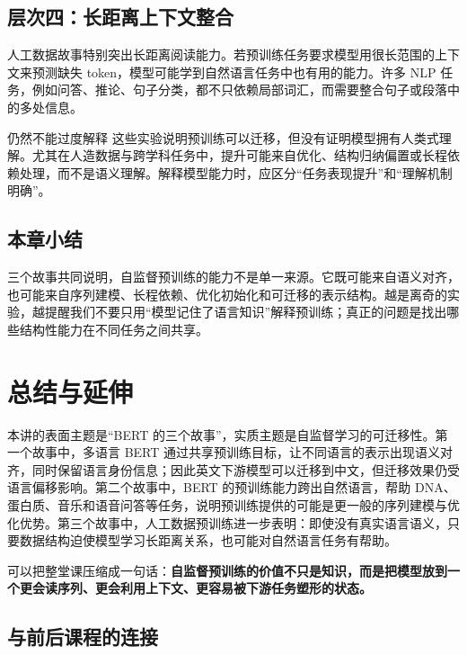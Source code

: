 \documentclass[a4paper]{article}
\begin{document}
\subsection{层次四：长距离上下文整合}

人工数据故事特别突出长距离阅读能力。若预训练任务要求模型用很长范围的上下文来预测缺失 token，模型可能学到自然语言任务中也有用的能力。许多 NLP 任务，例如问答、推论、句子分类，都不只依赖局部词汇，而需要整合句子或段落中的多处信息。

\begin{warningbox}{仍然不能过度解释}
    这些实验说明预训练可以迁移，但没有证明模型拥有人类式理解。尤其在人造数据与跨学科任务中，提升可能来自优化、结构归纳偏置或长程依赖处理，而不是语义理解。解释模型能力时，应区分“任务表现提升”和“理解机制明确”。
\end{warningbox}

\subsection{本章小结}

三个故事共同说明，自监督预训练的能力不是单一来源。它既可能来自语义对齐，也可能来自序列建模、长程依赖、优化初始化和可迁移的表示结构。越是离奇的实验，越提醒我们不要只用“模型记住了语言知识”解释预训练；真正的问题是找出哪些结构性能力在不同任务之间共享。

\section{总结与延伸}

本讲的表面主题是“BERT 的三个故事”，实质主题是自监督学习的可迁移性。第一个故事中，多语言 BERT 通过共享预训练目标，让不同语言的表示出现语义对齐，同时保留语言身份信息；因此英文下游模型可以迁移到中文，但迁移效果仍受语言偏移影响。第二个故事中，BERT 的预训练能力跨出自然语言，帮助 DNA、蛋白质、音乐和语音问答等任务，说明预训练提供的可能是更一般的序列建模与优化优势。第三个故事中，人工数据预训练进一步表明：即使没有真实语言语义，只要数据结构迫使模型学习长距离关系，也可能对自然语言任务有帮助。

可以把整堂课压缩成一句话：\textbf{自监督预训练的价值不只是知识，而是把模型放到一个更会读序列、更会利用上下文、更容易被下游任务塑形的状态。}

\subsection{与前后课程的连接}
\end{document}
